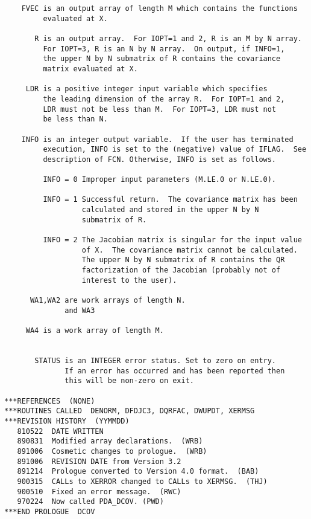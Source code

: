\begin{verbatim}
    FVEC is an output array of length M which contains the functions
         evaluated at X.

       R is an output array.  For IOPT=1 and 2, R is an M by N array.
         For IOPT=3, R is an N by N array.  On output, if INFO=1,
         the upper N by N submatrix of R contains the covariance
         matrix evaluated at X.

     LDR is a positive integer input variable which specifies
         the leading dimension of the array R.  For IOPT=1 and 2,
         LDR must not be less than M.  For IOPT=3, LDR must not
         be less than N.

    INFO is an integer output variable.  If the user has terminated
         execution, INFO is set to the (negative) value of IFLAG.  See
         description of FCN. Otherwise, INFO is set as follows.

         INFO = 0 Improper input parameters (M.LE.0 or N.LE.0).

         INFO = 1 Successful return.  The covariance matrix has been
                  calculated and stored in the upper N by N
                  submatrix of R.

         INFO = 2 The Jacobian matrix is singular for the input value
                  of X.  The covariance matrix cannot be calculated.
                  The upper N by N submatrix of R contains the QR
                  factorization of the Jacobian (probably not of
                  interest to the user).

      WA1,WA2 are work arrays of length N.
              and WA3

     WA4 is a work array of length M.


       STATUS is an INTEGER error status. Set to zero on entry.
              If an error has occurred and has been reported then
              this will be non-zero on exit.

***REFERENCES  (NONE)
***ROUTINES CALLED  DENORM, DFDJC3, DQRFAC, DWUPDT, XERMSG
***REVISION HISTORY  (YYMMDD)
   810522  DATE WRITTEN
   890831  Modified array declarations.  (WRB)
   891006  Cosmetic changes to prologue.  (WRB)
   891006  REVISION DATE from Version 3.2
   891214  Prologue converted to Version 4.0 format.  (BAB)
   900315  CALLs to XERROR changed to CALLs to XERMSG.  (THJ)
   900510  Fixed an error message.  (RWC)
   970224  Now called PDA_DCOV. (PWD)
***END PROLOGUE  DCOV
\end{verbatim}


